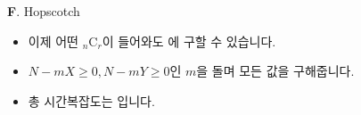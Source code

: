 \begin{frame}{\textbf{F}. Hopscotch}
    \begin{itemize}
        \item 이제 어떤 ${}_{n} \mathrm{C}_{r}$이 들어와도  에 구할 수 있습니다.
        \item $N-mX \geq 0, N-mY \geq 0$인 $m$을 돌며 모든 값을 구해줍니다.
        \item 총 시간복잡도는 입니다.
    \end{itemize}
\end{frame}
